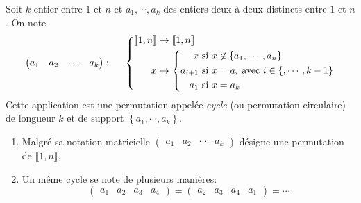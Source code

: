    
\begin{defi}
 Soit $k$ entier entre $1$ et $n$ et $a_1,\cdots,a_k$ des entiers deux à deux distincts entre $1$ et $n$. On note
\[
 \begin{pmatrix}
  a_1 & a_2 & \cdots & a_k
 \end{pmatrix}: \hspace{0.5cm}
 \left\lbrace
 \begin{aligned}
   \llbracket 1,n \rrbracket &\rightarrow \llbracket 1,n \rrbracket \\
   x &\mapsto 
    \left\lbrace 
       \begin{aligned}
           x&\text{ si }x\not\in\left\lbrace a_1,\cdots,a_n\right\rbrace\\
           a_{i+1} &\text{ si }x=a_i \text{ avec } i\in\left\lbrace,\cdots,k-1\right\rbrace \\
           a_1 &\text{ si }x=a_k
       \end{aligned}
    \right. 
 \end{aligned}
\right.
\]
Cette application est une permutation appelée \emph{cycle} (ou permutation circulaire) de longueur $k$ et de support $\left\lbrace a_1,\cdots,a_k \right\rbrace$.
\end{defi}
\begin{rems}
  \begin{enumerate}
    \item Malgré sa notation matricielle 
     $\begin{pmatrix}
        a_1 & a_2 & \cdots & a_k
     \end{pmatrix}$ désigne une permutation de $\llbracket 1,n \rrbracket$.
     \item Un même cycle se note de plusieurs manières:
\[
  \begin{pmatrix}a_1 & a_2 & a_3 & a_4 \end{pmatrix} = \begin{pmatrix}a_2 & a_3 & a_4 & a_1 \end{pmatrix} = \cdots 
\]

  \end{enumerate}

\end{rems}

